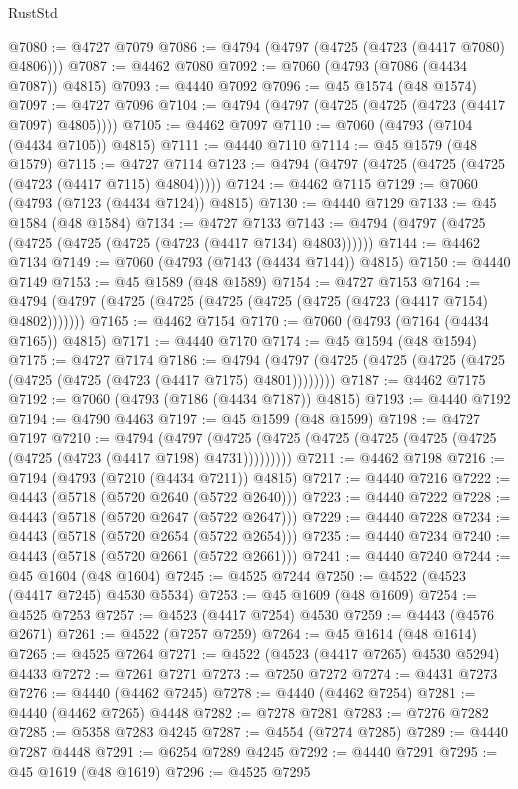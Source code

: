 \begin{lexlean}{RustStd}
\begin{coremodule}
{\begin{coremodule}
{{{{{{{{{{{{{{{{{{{{{{{{{{{{{{{{{{{{{{{{{{{{{{{{{{{{{{{{{{{{@7080 := @4727 @7079
@7086 := @4794 (@4797 (@4725 (@4723 (@4417 @7080) @4806)))
@7087 := @4462 @7080
@7092 := @7060 (@4793 (@7086 (@4434 @7087)) @4815)
@7093 := @4440 @7092
@7096 := @45 @1574 (@48 @1574)
@7097 := @4727 @7096
@7104 := @4794 (@4797 (@4725 (@4725 (@4723 (@4417 @7097) @4805))))
@7105 := @4462 @7097
@7110 := @7060 (@4793 (@7104 (@4434 @7105)) @4815)
@7111 := @4440 @7110
@7114 := @45 @1579 (@48 @1579)
@7115 := @4727 @7114
@7123 := @4794 (@4797 (@4725 (@4725 (@4725 (@4723 (@4417 @7115) @4804)))))
@7124 := @4462 @7115
@7129 := @7060 (@4793 (@7123 (@4434 @7124)) @4815)
@7130 := @4440 @7129
@7133 := @45 @1584 (@48 @1584)
@7134 := @4727 @7133
@7143 := @4794 (@4797 (@4725 (@4725 (@4725 (@4725 (@4723 (@4417 @7134) @4803))))))
@7144 := @4462 @7134
@7149 := @7060 (@4793 (@7143 (@4434 @7144)) @4815)
@7150 := @4440 @7149
@7153 := @45 @1589 (@48 @1589)
@7154 := @4727 @7153
@7164 := @4794 (@4797 (@4725 (@4725 (@4725 (@4725 (@4725 (@4723 (@4417 @7154) @4802)))))))
@7165 := @4462 @7154
@7170 := @7060 (@4793 (@7164 (@4434 @7165)) @4815)
@7171 := @4440 @7170
@7174 := @45 @1594 (@48 @1594)
@7175 := @4727 @7174
@7186 := @4794 (@4797 (@4725 (@4725 (@4725 (@4725 (@4725 (@4725 (@4723 (@4417 @7175) @4801))))))))
@7187 := @4462 @7175
@7192 := @7060 (@4793 (@7186 (@4434 @7187)) @4815)
@7193 := @4440 @7192
@7194 := @4790 @4463
@7197 := @45 @1599 (@48 @1599)
@7198 := @4727 @7197
@7210 := @4794
    (@4797 (@4725 (@4725 (@4725 (@4725 (@4725 (@4725 (@4725 (@4723 (@4417 @7198) @4731)))))))))
@7211 := @4462 @7198
@7216 := @7194 (@4793 (@7210 (@4434 @7211)) @4815)
@7217 := @4440 @7216
@7222 := @4443 (@5718 (@5720 @2640 (@5722 @2640)))
@7223 := @4440 @7222
@7228 := @4443 (@5718 (@5720 @2647 (@5722 @2647)))
@7229 := @4440 @7228
@7234 := @4443 (@5718 (@5720 @2654 (@5722 @2654)))
@7235 := @4440 @7234
@7240 := @4443 (@5718 (@5720 @2661 (@5722 @2661)))
@7241 := @4440 @7240
@7244 := @45 @1604 (@48 @1604)
@7245 := @4525 @7244
@7250 := @4522 (@4523 (@4417 @7245) @4530 @5534)
@7253 := @45 @1609 (@48 @1609)
@7254 := @4525 @7253
@7257 := @4523 (@4417 @7254) @4530
@7259 := @4443 (@4576 @2671)
@7261 := @4522 (@7257 @7259)
@7264 := @45 @1614 (@48 @1614)
@7265 := @4525 @7264
@7271 := @4522 (@4523 (@4417 @7265) @4530 @5294) @4433
@7272 := @7261 @7271
@7273 := @7250 @7272
@7274 := @4431 @7273
@7276 := @4440 (@4462 @7245)
@7278 := @4440 (@4462 @7254)
@7281 := @4440 (@4462 @7265) @4448
@7282 := @7278 @7281
@7283 := @7276 @7282
@7285 := @5358 @7283 @4245
@7287 := @4554 (@7274 @7285)
@7289 := @4440 @7287 @4448
@7291 := @6254 @7289 @4245
@7292 := @4440 @7291
@7295 := @45 @1619 (@48 @1619)
@7296 := @4525 @7295
}}}}}}}}}}}}}}}}}}}}}}}}}}}}}}}}}}}}}}}}}}}}}}}}}}}}}}}}}}}}
\end{coremodule}}
\end{coremodule}
\end{lexlean}
